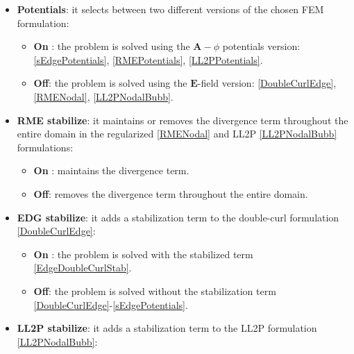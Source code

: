 \begin{itemize}
\begin{itemize}
		\item \textbf{EDG 2nd}: double-curl edge formulation with 2nd order elements \ref{DoubleCurlEdge}.
		\item \textbf{RME 1st}\,\,: regularized Maxwell equations method with 1st order nodal elements \ref{RMENodal}.
		\item \textbf{RME 2nd}: regularized Maxwell equations method with 2nd order nodal elements \ref{RMENodal}.
		\item \textbf{LL2P 3sb}: local $\text{L}^{2}$ projection method with 1st order nodal elements enriched with three surface bubbles plus an inner volumetric bubble \ref{LL2PNodalBubb}.
	\end{itemize}
	\quad
	\item \textbf{Potentials}: it selects between two different versions of the chosen FEM formulation:
	\begin{itemize}\itemsep0.25em 
		\item \textbf{On }: the problem is solved using the $\textbf{A}-\phi$ potentials version: \ref{sEdgePotentials}, \ref{RMEPotentials}, \ref{LL2PPotentials}.
		\item \textbf{Off}: the problem is solved using the $\textbf{E}$-field version: \ref{DoubleCurlEdge}, \ref{RMENodal}, \ref{LL2PNodalBubb}.
	\end{itemize}
	\quad
	\item \textbf{RME stabilize}: it maintains or removes the divergence term throughout the entire domain in the regularized \ref{RMENodal} and LL2P \ref{LL2PNodalBubb} formulations:
	\begin{itemize}\itemsep0.25em 
		\item \textbf{On }: maintains the divergence term.
		\item \textbf{Off}: removes the divergence term throughout the entire domain.
	\end{itemize}
	\quad
	\item \textbf{EDG stabilize}: it adds a stabilization term to the double-curl formulation \ref{DoubleCurlEdge}:
	\begin{itemize}\itemsep0.25em 
		\item \textbf{On }: the problem is solved with the stabilized term \ref{EdgeDoubleCurlStab}.
		\item \textbf{Off}: the problem is solved without the stabilization term \ref{DoubleCurlEdge}-\ref{sEdgePotentials}.
	\end{itemize}
	\quad
	\item \textbf{LL2P stabilize}: it adds a stabilization term to the LL2P formulation \ref{LL2PNodalBubb}:

\end{itemize}
